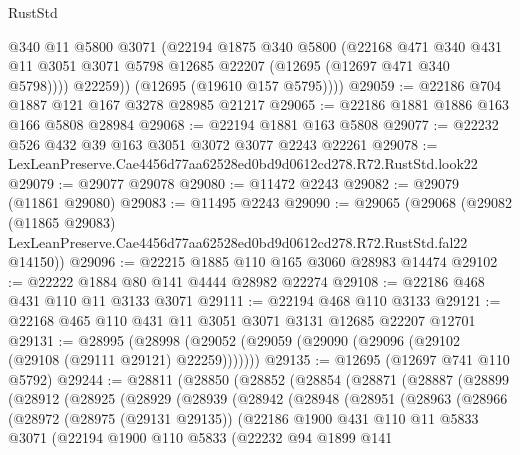 \begin{lexlean}{RustStd}
\begin{coremodule}
            @340
            @11
            @5800
            @3071
            (@22194
              @1875
              @340
              @5800
              (@22168
                @471
                @340
                @431
                @11
                @3051
                @3071
                @5798
                @12685
                @22207
                (@12695 (@12697 @471 @340 @5798))))
            @22259))
        (@12695 (@19610 @157 @5795))))
@29059 := @22186 @704 @1887 @121 @167 @3278 @28985 @21217
@29065 := @22186 @1881 @1886 @163 @166 @5808 @28984
@29068 := @22194 @1881 @163 @5808
@29077 := @22232 @526 @432 @39 @163 @3051 @3072 @3077 @2243 @22261
@29078 := LexLeanPreserve.Cae4456d77aa62528ed0bd9d0612cd278.R72.RustStd.look22
@29079 := @29077 @29078
@29080 := @11472 @2243
@29082 := @29079 (@11861 @29080)
@29083 := @11495 @2243
@29090 := @29065
    (@29068
      (@29082
        (@11865 @29083)
        LexLeanPreserve.Cae4456d77aa62528ed0bd9d0612cd278.R72.RustStd.fal22
        @14150))
@29096 := @22215 @1885 @110 @165 @3060 @28983 @14474
@29102 := @22222 @1884 @80 @141 @4444 @28982 @22274
@29108 := @22186 @468 @431 @110 @11 @3133 @3071
@29111 := @22194 @468 @110 @3133
@29121 := @22168 @465 @110 @431 @11 @3051 @3071 @3131 @12685 @22207 @12701
@29131 := @28995
    (@28998 (@29052 (@29059 (@29090 (@29096 (@29102 (@29108 (@29111 @29121) @22259)))))))
@29135 := @12695 (@12697 @741 @110 @5792)
@29244 := @28811
    (@28850
      (@28852
        (@28854
          (@28871
            (@28887
              (@28899
                (@28912
                  (@28925
                    (@28929
                      (@28939
                        (@28942
                          (@28948
                            (@28951
                              (@28963
                                (@28966
                                  (@28972
                                    (@28975 (@29131 @29135))
                                    (@22186
                                      @1900
                                      @431
                                      @110
                                      @11
                                      @5833
                                      @3071
                                      (@22194
                                        @1900
                                        @110
                                        @5833
                                        (@22232
                                          @94
                                          @1899
                                          @141

\end{coremodule}
\end{lexlean}

